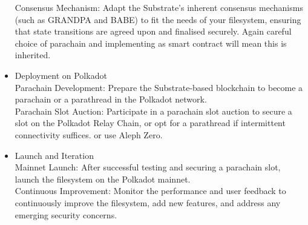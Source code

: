 \documentclass{tufte-handout}
\begin{document}
\begin{itemize}
Consensus Mechanism: Adapt the Substrate's inherent consensus mechanisms (such as GRANDPA and BABE) to fit the needs of your filesystem,
ensuring that state transitions are agreed upon and finalised securely. Again careful choice of parachain and implementing as smart contract
will mean this is inherited.
\item Deployment on Polkadot\\
\vspace{5pt}
Parachain Development: Prepare the Substrate-based blockchain to become a parachain or a parathread in the Polkadot network.\\
\vspace{5pt}
Parachain Slot Auction: Participate in a parachain slot auction to secure a slot on the Polkadot Relay Chain, or opt for a parathread if
intermittent connectivity suffices. or use Aleph Zero.
\item Launch and Iteration\\
\vspace{5pt}
Mainnet Launch: After successful testing and securing a parachain slot, launch the filesystem on the Polkadot mainnet.\\
\vspace{5pt}
Continuous Improvement: Monitor the performance and user feedback to continuously improve the filesystem, add new features, and address any
emerging security concerns.
\end{itemize}
\end{document}
